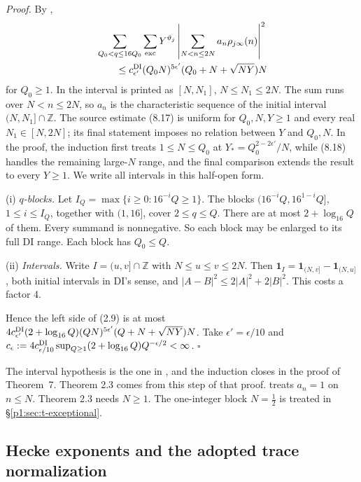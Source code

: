\emph{Proof.} By \cite[(8.17) and (8.4)]{DI82},
\[
\begin{aligned}
&\sum_{Q_0<q\le16Q_0}\sum_{\rm exc}Y^{\vartheta_j}
 \left|\sum_{N<n\le2N}a_n\rho_{j\infty}(n)\right|^2\\
&\qquad\le c^{\rm DI}_{\epsilon'}(Q_0N)^{5\epsilon'}
                  (Q_0+N+\sqrt{NY})N
\end{aligned}
\]
for $Q_0\ge1$. In \cite{DI82} the interval is printed as $[N,N_1]$, $N\le N_1\le2N$. The sum runs over $N<n\le2N$, so $a_n$ is the characteristic sequence of the initial interval
$(N,N_1]\cap\mathbb Z$. The source estimate (8.17) is uniform for
$Q_0,N,Y\ge1$ and every real $N_1\in[N,2N]$; its final statement imposes
no relation between $Y$ and $Q_0,N$. In the proof, the induction first treats
$1\le N\le Q_0$ at $Y_*=Q_0^{2-2\epsilon'}/N$, while (8.18) handles the
remaining large-$N$ range, and the final comparison extends the result to
every $Y\ge1$. We write all intervals in this half-open form.

(i) \emph{$q$-blocks.} Let $I_Q=\max\{i\ge0:16^{-i}Q\ge1\}$. The blocks $(16^{-i}Q,16^{1-i}Q]$,
$1\le i\le I_Q$, together with $(1,16]$, cover $2\le q\le Q$. There are at most $2+\log_{16}Q$ of
them. Every summand is nonnegative. So each block may be enlarged to its full DI range. Each block has
$Q_0\le Q$.

(ii) \emph{Intervals.} Write $I=(u,v]\cap\mathbb Z$ with $N\le u\le v\le2N$. Then
$\mathbf1_I=\mathbf1_{(N,v]}-\mathbf1_{(N,u]}$, both initial intervals in DI's sense, and
$|A-B|^2\le2|A|^2+2|B|^2$. This costs a factor 4.

Hence the left side of (2.9) is at most
$4c^{\rm DI}_{\epsilon'}(2+\log_{16}Q)(QN)^{5\epsilon'}(Q+N+\sqrt{NY})N$. Take $\epsilon'=\epsilon/10$
and $c_\epsilon:=4c^{\rm DI}_{\epsilon/10}\sup_{Q\ge1}(2+\log_{16}Q)Q^{-\epsilon/2}<\infty$. \hfill$\square$

The interval hypothesis is the one in \cite[(8.17)]{DI82}, and the induction closes in the proof of Theorem~7. Theorem 2.3 comes from this step of that proof. \cite[Theorem~7]{DI82} treats $a_n=1$ on $n\le N$. Theorem 2.3 needs $N\ge1$. The one-integer block $N=\tfrac12$ is
treated in \S\ref{p1:sec:t-exceptional}.

\subsection{Hecke exponents and the adopted trace normalization}

